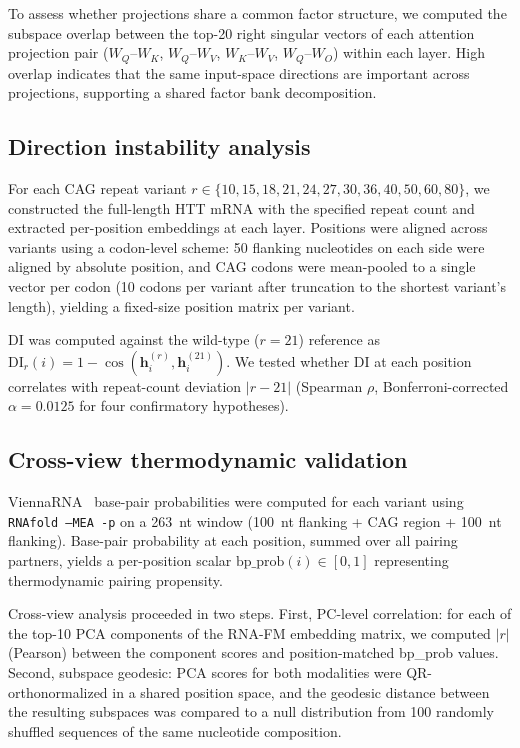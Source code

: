 \documentclass[11pt]{article}
\begin{document}
To assess whether projections share a common factor structure, we
computed the subspace overlap between the top-20 right singular vectors
of each attention projection pair ($W_Q$--$W_K$, $W_Q$--$W_V$,
$W_K$--$W_V$, $W_Q$--$W_O$) within each layer. High overlap indicates
that the same input-space directions are important across projections,
supporting a shared factor bank decomposition.

\subsection{Direction instability analysis}

For each CAG repeat variant $r \in \{10, 15, 18, 21, 24, 27, 30, 36,
40, 50, 60, 80\}$, we constructed the full-length HTT mRNA with the
specified repeat count and extracted per-position embeddings at each
layer. Positions were aligned across variants using a codon-level
scheme: 50 flanking nucleotides on each side were aligned by absolute
position, and CAG codons were mean-pooled to a single vector per codon
(10 codons per variant after truncation to the shortest variant's
length), yielding a fixed-size position matrix per variant.

DI was computed against the wild-type ($r = 21$) reference as
$\mathrm{DI}_r(i) = 1 - \cos(\mathbf{h}_i^{(r)},
\mathbf{h}_i^{(21)})$. We tested whether DI at each position
correlates with repeat-count deviation $|r - 21|$ (Spearman $\rho$,
Bonferroni-corrected $\alpha = 0.0125$ for four confirmatory
hypotheses).

\subsection{Cross-view thermodynamic validation}

ViennaRNA~\citep{lorenz2011viennarna} base-pair probabilities were
computed for each variant using \texttt{RNAfold --MEA -p} on a 263~nt
window (100~nt flanking + CAG region + 100~nt flanking). Base-pair
probability at each position, summed over all pairing partners, yields
a per-position scalar $\mathrm{bp\_prob}(i) \in [0, 1]$
representing thermodynamic pairing propensity.

Cross-view analysis proceeded in two steps. First, PC-level
correlation: for each of the top-10 PCA components of the RNA-FM
embedding matrix, we computed $|r|$ (Pearson) between the component
scores and position-matched bp\_prob values. Second, subspace
geodesic: PCA scores for both modalities were QR-orthonormalized in
a shared position space, and the geodesic distance between the
resulting subspaces was compared to a null distribution from 100
randomly shuffled sequences of the same nucleotide composition.
\end{document}
